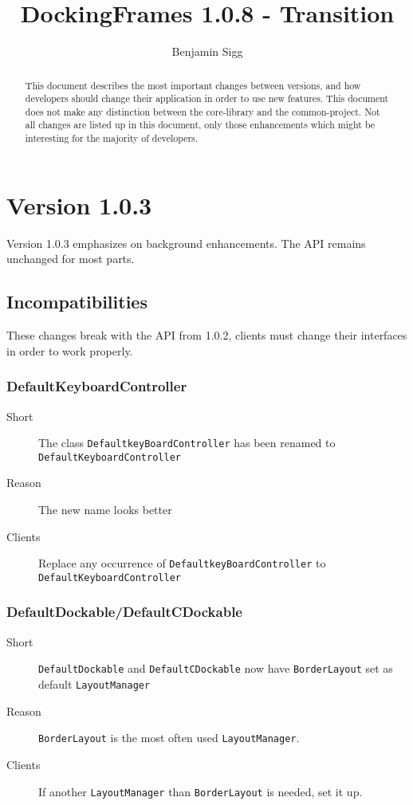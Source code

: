 \documentclass[a4paper,10pt]{article}
\title{DockingFrames 1.0.8 - Transition}
\author{Benjamin Sigg}
\newcommand{\src}[1]{\lstinline[basicstyle=\normalsize\ttfamily,keywordstyle=\normalsize\ttfamily,identifierstyle=\normalsize\ttfamily]|#1|}
\newcommand{\short}{\item[Short]}
\newcommand{\why}{\item[Reason]}
\newcommand{\clients}{\item[Clients]}
\begin{document}
\maketitle
\tableofcontents
\newpage


\begin{abstract}
This document describes the most important changes between versions, and how developers should change their application in order to use new features. This document does not make any distinction between the core-library and the common-project. Not all changes are listed up in this document, only those enhancements which might be interesting for the majority of developers.
\end{abstract}

\section{Version 1.0.3}
Version 1.0.3 emphasizes on background enhancements. The API remains unchanged for most parts.
\subsection{Incompatibilities}
These changes break with the API from 1.0.2, clients must change their interfaces in order to work properly.

\subsubsection{DefaultKeyboardController}
\begin{description}
\short The class \src{DefaultkeyBoardController} has been renamed to \\\src{DefaultKeyboardController} 
\why The new name looks better
\clients Replace any occurrence of \src{DefaultkeyBoardController} to \\\src{DefaultKeyboardController}
\end{description}

\subsubsection{DefaultDockable/DefaultCDockable}
\begin{description}
 \short \src{DefaultDockable} and \src{DefaultCDockable} now have \src{BorderLayout} set as default \src{LayoutManager}
 \why \src{BorderLayout} is the most often used \src{LayoutManager}.
 \clients If another \src{LayoutManager} than \src{BorderLayout} is needed, set it up.
\end{description}
\end{document}
